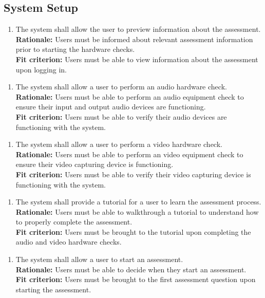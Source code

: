 \documentclass[12pt]{article}
\begin{document}
\subsection{System Setup}
\begin{enumerate}[label={FR-SS}1. ]
  \item The system shall allow the user to preview information about the assessment.\\
  \textbf{Rationale: }Users must be informed about relevant assessment information prior to starting the hardware checks.\\
  \textbf{Fit criterion: }Users must be able to view information about the assessment upon logging in.
\end{enumerate}
\begin{enumerate}[label={FR-SS}2. ]
  \item The system shall allow a user to perform an audio hardware check.\\
  \textbf{Rationale: }Users must be able to perform an audio equipment check to ensure their input and output audio devices are functioning.\\
  \textbf{Fit criterion: }Users must be able to verify their audio devices are functioning with the system.
\end{enumerate}
\begin{enumerate}[label={FR-SS}3. ]
  \item The system shall allow a user to perform a video hardware check.\\
  \textbf{Rationale: }Users must be able to perform an video equipment check to ensure their video capturing device is functioning.\\
  \textbf{Fit criterion: }Users must be able to verify their video capturing device is functioning with the system.  
\end{enumerate}
\begin{enumerate}[label={FR-SS}4. ]
  \item The system shall provide a tutorial for a user to learn the assessment process.\\
  \textbf{Rationale: }Users must be able to walkthrough a tutorial to understand how to properly complete the assessment.\\
  \textbf{Fit criterion: }Users must be brought to the tutorial upon completing the audio and video hardware checks.  
\end{enumerate}
\begin{enumerate}[label={FR-SS}5. ]
  \item The system shall allow a user to start an assessment.\\
  \textbf{Rationale: }Users must be able to decide when they start an assessment.\\
  \textbf{Fit criterion: }Users must be brought to the first assessment question upon starting the assessment.  
\end{enumerate}
\end{document}
